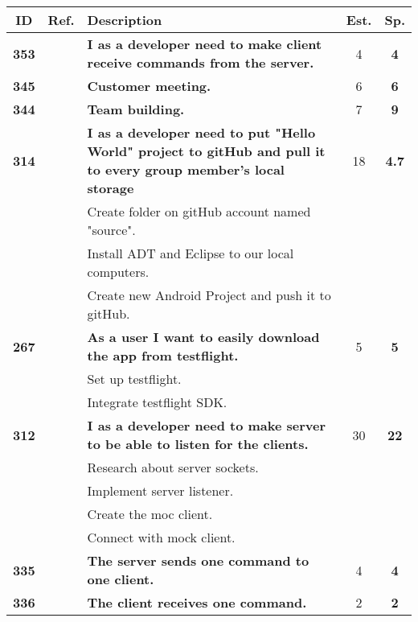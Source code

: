   \label{tab:sprint1stories}
 \def\arraystretch{1.25}
 
\begin{longtable}{ccXcc}

\toprule[1mm]
\textbf{ID} 	&
\textbf{Ref.}   &
 \textbf{Description} 									& \textbf{Est.} & \textbf{Sp.} \\
\hline
\textbf{353} 	& {F1}
	& {\bf I as a developer need to make client receive commands from the server.} 	& 	4		& \textbf{4} \\

\textbf{345} 	&& {\bf Customer meeting.} 	& 		6	& \textbf{6} \\

\textbf{344} 	&& {\bf Team building.} 	& 		7	& \textbf{9} \\
				
\textbf{314} 	& {F1}
	& {\bf I as a developer need to put "Hello World" project to gitHub and pull it to every group member's local storage} 	& 	18	& \textbf{ 4.7} \\
				&& Create folder on gitHub account named "source".	&  &  \\
				&& Install ADT and Eclipse to our local computers. 	&  &  \\
				&& Create new Android Project and push it to gitHub. 	&  &  \\
				
\textbf{267} 	&& {\bf As a user I want to easily download the app from testflight. } 	& 		5	& \textbf{5} \\
				&& Set up testflight.	&  &  \\
				&& Integrate testflight SDK. &  &  \\
				
\textbf{312} 	& {F1}
	& {\bf I as a developer need to make server to be able to listen for the clients.} 	& 	30	& \textbf{22} \\
				&& Research about server sockets.	&  &  \\
				&& Implement server listener.	&  &  \\
				&& Create the moc client. &  &  \\
				&& Connect with mock client. &  &  \\
				
\textbf{335} 	& {F1}
	& {\bf The server sends one command to one client. } 	& 		4	& \textbf{4} \\

\textbf{336} 	& {F1}
	& {\bf The client receives one command. } 	& 	2	& \textbf{2} \\


\end{longtable}
